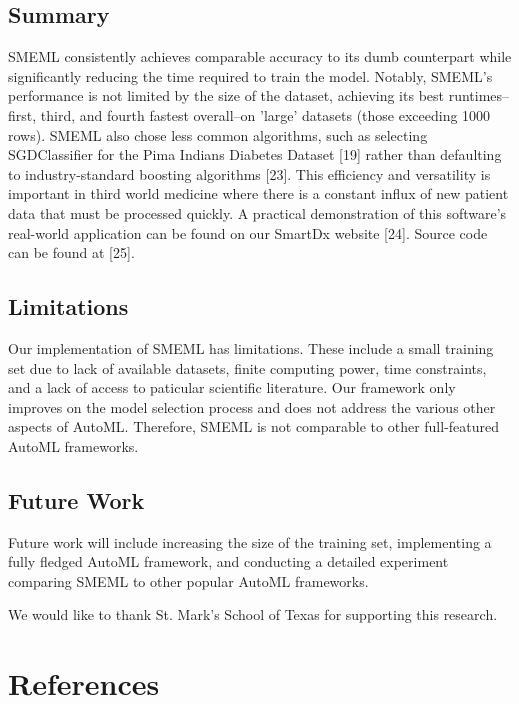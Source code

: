 \documentclass{article}
\begin{document}
\subsection{Summary}
SMEML consistently achieves comparable accuracy to its dumb counterpart while significantly reducing the time required to train the model. Notably, SMEML's performance is not limited by the size of the dataset, achieving its best runtimes--first, third, and fourth fastest overall--on 'large' datasets (those exceeding 1000 rows). SMEML also chose less common algorithms, such as selecting SGDClassifier for the Pima Indians Diabetes Dataset [19] rather than defaulting to industry-standard boosting algorithms [23]. This efficiency and versatility is important in third world medicine where there is a constant influx of new patient data that must be processed quickly. A practical demonstration of this software's real-world application can be found on our SmartDx website [24]. Source code can be found at [25].
\subsection{Limitations}
Our implementation of SMEML has limitations. These include a small training set due to lack of available datasets, finite computing power, time constraints, and a lack of access to paticular scientific literature. Our framework only improves on the model selection process and does not address the various other aspects of AutoML. Therefore, SMEML is not comparable to other full-featured AutoML frameworks.
\subsection{Future Work}
Future work will include increasing the size of the training set, implementing a fully fledged AutoML framework, and conducting a detailed experiment comparing SMEML to other popular AutoML frameworks. 

\begin{ack}
We would like to thank St. Mark's School of Texas for supporting this research.
\end{ack}

\section*{References}
\end{document}
